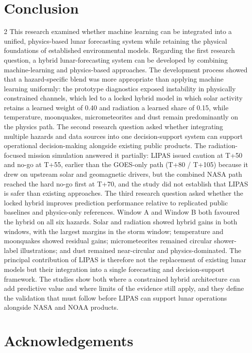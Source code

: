 \section{Conclusion}
\begin{multicols}{2}
This research examined whether machine learning can be integrated into a unified, physics-based lunar forecasting system while retaining the physical foundations of established environmental models. Regarding the first research question, a hybrid lunar-forecasting system can be developed by combining machine-learning and physics-based approaches. The development process showed that a hazard-specific blend was more appropriate than applying machine learning uniformly: the prototype diagnostics exposed instability in physically constrained channels, which led to a locked hybrid model in which solar activity retains a learned weight of 0.40 and radiation a learned share of 0.15, while temperature, moonquakes, micrometeorites and dust remain predominantly on the physics path. The second research question asked whether integrating multiple hazards and data sources into one decision-support system can support operational decision-making alongside existing public products. The radiation-focused mission simulation answered it partially: LIPAS issued caution at T+50 and no-go at T+55, earlier than the GOES-only path (T+80 / T+105) because it drew on upstream solar and geomagnetic drivers, but the combined NASA path reached the hard no-go first at T+70, and the study did not establish that LIPAS is safer than existing approaches. The third research question asked whether the locked hybrid improves prediction performance relative to replicated public baselines and physics-only references. Window A and Window B both favoured the hybrid on all six hazards. Solar and radiation showed hybrid gains in both windows, with the largest margins in the storm window; temperature and moonquakes showed residual gains; micrometeorites remained circular shower-label illustrations; and dust remained near-circular and physics-dominated. The principal contribution of LIPAS is therefore not the replacement of existing lunar models but their integration into a single forecasting and decision-support framework. The studies show both where a constrained hybrid architecture can add predictive value and where limits of the evidence still apply, and they define the validation that must follow before LIPAS can support lunar operations alongside NASA and NOAA products.

\section*{Acknowledgements}


\end{multicols}
